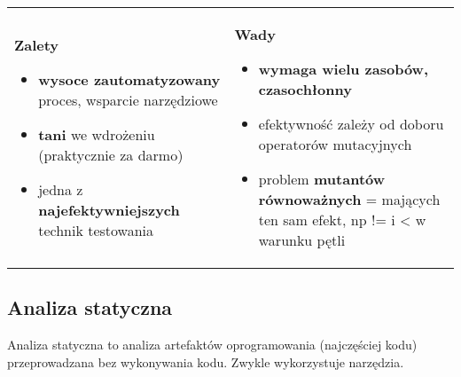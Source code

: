 \documentclass[../main.tex]{subfiles}
\begin{document}
    \begin{table}[H]
        \begin{center}
            \begin{tabular}{p{8cm} p{8cm}}
                \textbf{Zalety}
                \begin{itemize}
                    \item \textbf{wysoce zautomatyzowany} proces, wsparcie narzędziowe
                    \item \textbf{tani} we wdrożeniu (praktycznie za darmo)
                    \item jedna z \textbf{najefektywniejszych} technik testowania
                \end{itemize}
                &
                \textbf{Wady}
                \begin{itemize}
                    \item \textbf{wymaga wielu zasobów, czasochłonny}
                    \item efektywność zależy od doboru operatorów mutacyjnych
                    \item problem \textbf{mutantów równoważnych} = mających ten sam efekt, np != i < w warunku pętli
                \end{itemize}
            \end{tabular}
        \end{center}
    \end{table}


    \subsection{Analiza statyczna}
    Analiza statyczna to analiza artefaktów oprogramowania (najczęściej kodu) przeprowadzana bez wykonywania kodu.
    Zwykle wykorzystuje narzędzia.
\end{document}
